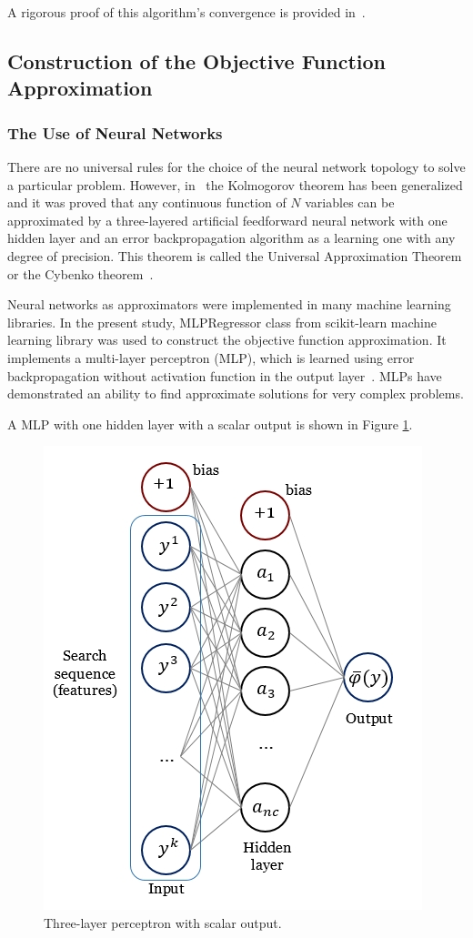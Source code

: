 \documentclass[mathematics,article,accept,pdftex,moreauthors]{Definitions/mdpi}
\begin{document}
A rigorous proof of this algorithm's convergence is provided in~\cite{Strongin2000}. 

\newpage

\subsection{Construction of the Objective Function Approximation}

\subsubsection{The Use of Neural Networks}

There are no universal rules for the choice of the neural network topology to solve a particular problem. However, in~\cite{Cybenko1989} the Kolmogorov theorem has been generalized and it was proved that any continuous function of $N$ variables can be approximated by a three-layered artificial feedforward neural network with one hidden layer and an error backpropagation algorithm as a learning one with any degree of precision. This theorem is called the Universal Approximation Theorem or the Cybenko theorem~\cite{Hassoun1995}.

Neural networks as approximators were implemented in many machine learning libraries.
In the present study, MLPRegressor class from scikit-learn machine learning library was used  to construct the objective function approximation. It implements a multi-layer perceptron (MLP), which is learned using error backpropagation without activation function in the output layer~\cite{Nielsen1989}. MLPs have demonstrated an ability to find approximate solutions for very complex problems.

A MLP with one hidden layer with a scalar output is shown in Figure \ref{fig1}.

\begin{figure}[H]
 
\includegraphics[width=5 cm]{perceptron.jpg}
\caption{Three-layer perceptron with scalar output.\label{fig1}}
 
\end{figure}
 
\end{document}
